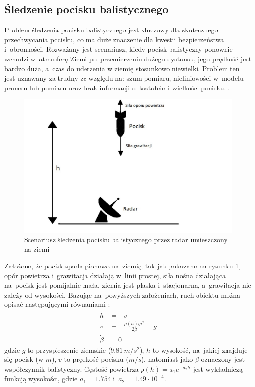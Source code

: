\subsection{Śledzenie pocisku balistycznego}
\label{subsec:ballistic_target_tracking}
Problem śledzenia pocisku balistycznego jest kluczowy dla skutecznego przechwycania pocisku, co ma duże znaczenie dla kwestii bezpieczeństwa i~obronności. Rozważany jest scenariusz, kiedy pocisk balistyczny ponownie wchodzi w~atmosferę Ziemi po~przemierzeniu dużego dystansu, jego prędkość jest bardzo duża, a~czas do uderzenia w ziemię stosunkowo niewielki. Problem ten jest uznawany za trudny ze względu na: szum pomiaru, nieliniowości w~modelu procesu lub pomiaru oraz brak informacji o~kształcie i~wielkości pocisku. \cite{MisslieTracking1}\cite{MissileTracking2}.
\begin{figure}[h!]
	\centering
	\includegraphics[width=0.8\linewidth]{missile_tracking_illustration.jpg}
	\caption{Scenariusz śledzenia pocisku balistycznego przez radar umieszczony na ziemi}
	\label{fig:missile_tracking_illustration}
\end{figure}
\par
Założono, że pocisk spada pionowo na~ziemię, tak jak pokazano na rysunku \ref{fig:missile_tracking_illustration}, opór powietrza i~grawitacja działają w~linii prostej, siła nośna działająca na~pocisk jest pomijalnie mała, ziemia jest płaska i~stacjonarna, a~grawitacja nie zależy od wysokości. Bazując na~powyższych założeniach, ruch obiektu można opisać następującymi równaniami \cite{MissileTrackingEquations}:
\begin{align}\label{eq:missile_tracking_model}
\dot{h} &= -v \nonumber \\
\dot{v} &= - \frac{\rho(h)gv^2}{2\beta} + g \nonumber \\
\dot{\beta} &= 0
\end{align}
gdzie $g$ to przyspieszenie ziemskie ($9.81\,m/s^2$), $h$ to wysokość, na~jakiej znajduje się pocisk (w $m$), $v$ to prędkość pocisku ($m/s$), natomiast jako $\beta$ oznaczony jest współczynnik balistyczny. Gęstość powietrza $\rho(h)=a_1e^{-a_2h}$ jest wykładniczą funkcją wysokości, gdzie $a_1=1.754$ i~$a_2=1.49\cdot10^{-4}$.
